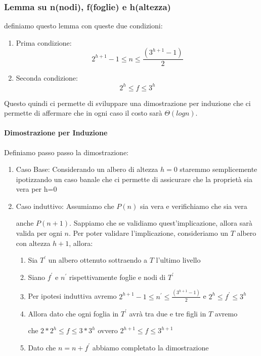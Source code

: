 \documentclass{article}
\begin{document}
\subsubsection{Lemma su n(nodi), f(foglie) e h(altezza)} definiamo questo lemma con queste due condizioni:

\begin{enumerate}
\item Prima condizione:
\begin{equation}
    2^{h+1}-1 \leq n \leq \frac{(3^{h+1}-1)}{2}
\end{equation}

\item Seconda condizione:
\begin{equation}
    2^h \leq f \leq 3^h
\end{equation}

\end{enumerate}

Questo quindi ci permette di sviluppare una dimostrazione per induzione che ci permette di affermare che in ogni caso il costo sarà $\Theta(log n)$.

\paragraph{Dimostrazione per Induzione} Definiamo passo passo la dimostrazione:

\begin{enumerate}
    \item Caso Base: Considerando un albero di altezza $h=0$ staremmo semplicemente ipotizzando un caso banale che ci permette di assicurare che la proprietà sia vera per h=0
    \item Caso induttivo: Assumiamo che $P(n)$ sia vera e verifichiamo che sia vera 
    
    anche $P(n+1)$. Sappiamo che se validiamo quest'implicazione, allora sarà valida per ogni $n$.
    Per poter validare l'implicazione, consideriamo un $T$ albero con altezza $h+1$, allora:

    \begin{enumerate}
        \item Sia $T^{'}$ un albero ottenuto sottraendo a $T$ l'ultimo livello
        \item Siano $f^{'}$ e $n^{'}$ rispettivamente foglie e nodi di $T^{'}$
        \item Per ipotesi induttiva avremo $2^{h+1}-1 \leq n^{'} \leq \frac{(3^{h+1}-1)}{2}$ e $2^h \leq f^{'} \leq 3^h$
        \item Allora dato che ogni foglia in $T^{'}$ avrà tra due e tre figli in $T$ avremo
        
        che $2*2^h \leq f \leq 3*3^h$ ovvero $2^{h+1} \leq f \leq 3^{h+1}$
        \item Dato che $n=n+f^{'}$ abbiamo completato la dimostrazione
    \end{enumerate}
    
\end{enumerate}
\end{document}
